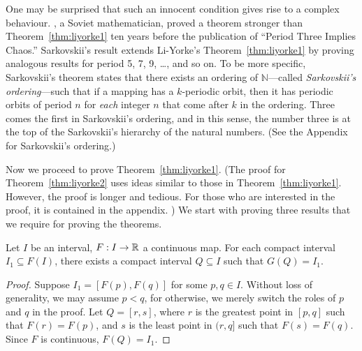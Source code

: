 \documentclass[10pt,draft,twoside]{book}
\begin{document}
One may be surprised that such an innocent condition gives rise to a complex behaviour.
\citet{sarkovskii}, a Soviet mathematician, proved a theorem stronger than Theorem~\ref{thm:liyorke1} ten years before the publication of ``Period Three Implies Chaos.''
Sarkovskii's result extends Li-Yorke's Theorem~\ref{thm:liyorke1} by proving analogous results for period 5, 7, 9, \ldots, and so on.
To be more specific, Sarkovskii's theorem states that there exists an ordering of $\mathbb{N}$---called \textit{Sarkovskii's ordering}---such that if a mapping has a $k$-periodic orbit, then it has periodic orbits of period $n$ for \textit{each} integer $n$ that come after $k$ in the ordering.
Three comes the first in Sarkovskii's ordering, and in this sense, the number three is at the top of the Sarkovskii's hierarchy of the natural numbers.
(See the Appendix for Sarkovskii's ordering.)

Now we proceed to prove Theorem~\ref{thm:liyorke1}. 
(The proof for Theorem~\ref{thm:liyorke2} uses ideas similar to those in Theorem~\ref{thm:liyorke1}.
However, the proof is longer and tedious.
For those who are interested in the proof, it is contained in the appendix.
)
We start with proving three results that we require for proving the theorems.

\begin{proposition}
  Let $I$ be an interval, $F: I \to \mathbb{R}$ a continuous map.
  For each compact interval $I_1 \subseteq F(I)$, there exists a compact interval $Q \subseteq I$ such that $G(Q) = I_1$.
  \label{prop:liyorke1}
  \begin{proof}
    Suppose $I_1 = [F(p),F(q)]$ for some $p,q \in I$.
    Without loss of generality, we may assume $p < q$, for otherwise, we merely switch the roles of $p$ and $q$ in the proof.
    Let $Q = [r,s]$, where $r$ is the greatest point in $[p,q]$ such that $F(r) = F(p)$, and $s$ is the least point in $(r,q]$ such that $F(s) = F(q)$.
    Since $F$ is continuous, $F(Q) = I_1$.
  \end{proof}
\end{proposition}
\end{document}
